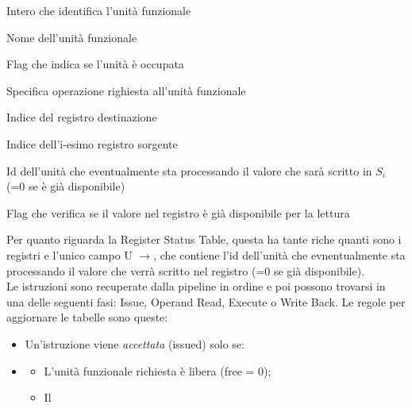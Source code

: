 \begin{description}[style=nextline,leftmargin=3.45cm,labelwidth=2.8cm,labelsep=0.4cm,font=\ttfamily\bfseries, itemsep=0.01em]
\item[id] Intero che identifica l'unità funzionale
\item[name] Nome dell'unità funzionale
\item[busy] Flag che indica se l'unità è occupata
\item[op] Specifica operazione righiesta all'unità funzionale 
\item[D] Indice del registro destinazione 
\item[$S_i$] Indice dell'i-esimo registro sorgente    
\item[$U_i$] Id dell'unità che eventualmente sta processando il valore che sarà scritto in $S_i$ (=0 se è già disponibile)
\item[$A_i$] Flag che verifica se il valore nel registro è già disponibile per la lettura  
\end{description}

\noindent Per quanto riguarda la Register Status Table, questa ha tante riche quanti sono i registri e l'unico campo U $\rightarrow$, che contiene l'id dell'unità che evnentualmente sta processando il valore che verrà scritto nel registro (=0 se già disponibile).
\\ \noindent Le istruzioni sono recuperate dalla pipeline in ordine e poi possono trovarsi in una delle seguenti fasi: Issue, Operand Read, Execute o Write Back. 
Le regole per aggiornare le tabelle sono queste:

\begin{itemize}
    \item Un'istruzione viene \textit{accettata} (issued) solo se:
    \item \begin{itemize}
        \item L'unità funzionale richiesta è libera (free = 0);
        \item Il 
    \end{itemize}
\end{itemize}

